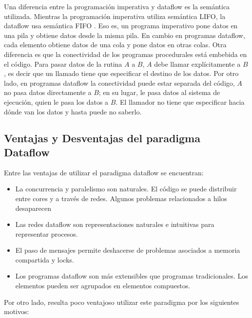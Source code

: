 Una diferencia entre la programación imperativa y dataflow es
la semántica utilizada. Mientras la programación imperativa utiliza semántica
LIFO, la dataflow usa semántica FIFO \cite{DataflowRichardHarter}. Eso es, un
programa imperativo pone datos en una pila y obtiene datos desde la misma pila.
En cambio en programas dataflow, cada elemento obtiene datos de una cola y pone
datos en otras colas.
Otra diferencia es que la conectividad de los programas procedurales está
embebida en el código. Para pasar datos de la rutina $A$ a $B$, $A$ debe
llamar explícitamente a $B$, es decir que un llamado tiene que especificar el
destino de los datos.
Por otro lado, en programas dataflow la conectividad puede estar separada
del código, $A$ no pasa datos directamente a $B$; en su lugar, le pasa datos al
sistema de ejecución, quien le pasa los datos a $B$.
El llamador no tiene que especificar hacia dónde van los datos y hasta puede
no saberlo. \cite{DataflowRichardHarter}

\subsection*{Ventajas y Desventajas del paradigma Dataflow}

Entre las ventajas de utilizar el paradigma dataflow se encuentran:

\begin{itemize}
  \item La concurrencia y paralelismo son naturales. El código se puede distribuir entre cores y a través de redes. Algunos
  problemas relacionados a hilos desaparecen
  \item Las redes dataflow son representaciones naturales e intuitivas para
  representar procesos.
  \item El paso de mensajes permite deshacerse de problemas asociados a memoria compartida y locks.
  \item Los programas dataflow son más extensibles que programas tradicionales.
  Los elementos pueden ser agrupados en elementos compuestos.
\end{itemize}

Por otro lado, resulta poco ventajoso utilizar este paradigma por los siguientes
motivos:

